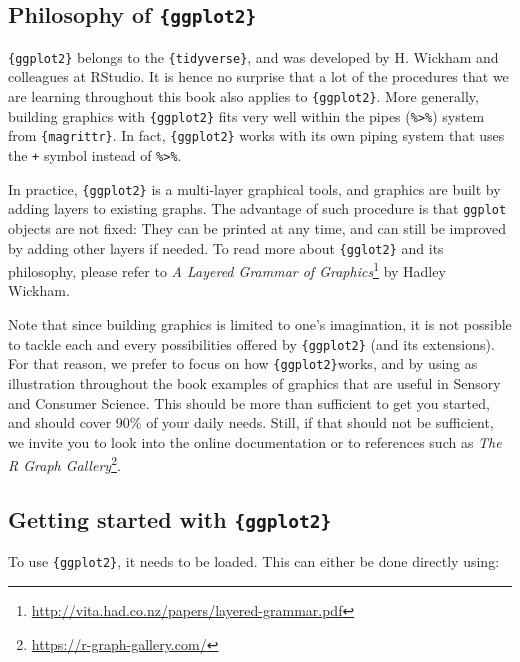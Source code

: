 \documentclass[
]{krantz}
\renewcommand{\href}[2]{#2\footnote{\url{#1}}}
\begin{document}
\hypertarget{philosophy-of-ggplot2}{%
\subsection{\texorpdfstring{Philosophy of \texttt{\{ggplot2\}}}{Philosophy of \{ggplot2\}}}\label{philosophy-of-ggplot2}}

\texttt{\{ggplot2\}} belongs to the \texttt{\{tidyverse\}}, and was developed by H. Wickham and colleagues at RStudio. It is hence no surprise that a lot of the procedures that we are learning throughout this book also applies to \texttt{\{ggplot2\}}. More generally, building graphics with \texttt{\{ggplot2\}} fits very well within the pipes (\texttt{\%\textgreater{}\%}) system from \texttt{\{magrittr\}}. In fact, \texttt{\{ggplot2\}} works with its own piping system that uses the \texttt{+} symbol instead of \texttt{\%\textgreater{}\%}.

In practice, \texttt{\{ggplot2\}} is a multi-layer graphical tools, and graphics are built by adding layers to existing graphs. The advantage of such procedure is that \texttt{ggplot} objects are not fixed: They can be printed at any time, and can still be improved by adding other layers if needed. To read more about \texttt{\{gglot2\}} and its philosophy, please refer to
\href{http://vita.had.co.nz/papers/layered-grammar.pdf}{\emph{A Layered Grammar of Graphics}} by Hadley Wickham.

Note that since building graphics is limited to one's imagination, it is not possible to tackle each and every possibilities offered by \texttt{\{ggplot2\}} (and its extensions). For that reason, we prefer to focus on how \texttt{\{ggplot2\}}works, and by using as illustration throughout the book examples of graphics that are useful in Sensory and Consumer Science. This should be more than sufficient to get you started, and should cover 90\% of your daily needs. Still, if that should not be sufficient, we invite you to look into the online documentation or to references such as \href{https://r-graph-gallery.com/}{\emph{The R Graph Gallery}}.

\hypertarget{ggplot2}{%
\subsection{\texorpdfstring{Getting started with \texttt{\{ggplot2\}}}{Getting started with \{ggplot2\}}}\label{ggplot2}}

To use \texttt{\{ggplot2\}}, it needs to be loaded. This can either be done directly using:
\end{document}
